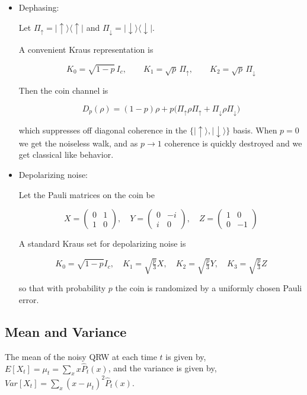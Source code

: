 \documentclass[11pt]{article}
\begin{document}
\begin{itemize}
\item Dephasing:

Let $\Pi_\uparrow = |\uparrow\rangle\langle\uparrow|$ and $\Pi_\downarrow = |\downarrow\rangle\langle\downarrow|$.

A convenient Kraus representation is

\[
K_0 = \sqrt{1-p}\,I_c, \qquad
K_1 = \sqrt{p}\,\Pi_\uparrow, \qquad
K_2 = \sqrt{p}\,\Pi_\downarrow
\]

Then the coin channel is

\begin{equation}\label{eq:5}
D_p(\rho) = (1-p)\rho + p\big(\Pi_\uparrow \rho \Pi_\uparrow + \Pi_\downarrow \rho \Pi_\downarrow\big)
\end{equation}

which suppresses off diagonal coherence in the $\{|\uparrow\rangle,|\downarrow\rangle\}$ basis. When $p=0$ we get the noiseless walk, and as $p\to 1$ coherence is quickly destroyed and we get classical like behavior.

\item Depolarizing noise:

Let the Pauli matrices on the coin be

\[
X=\begin{pmatrix}0&1\\1&0\end{pmatrix},\quad Y=\begin{pmatrix}0&-i\\ i&0\end{pmatrix},\quad Z=\begin{pmatrix}1&0\\0&-1\end{pmatrix}
\]

A standard Kraus set for depolarizing noise is

\[
K_0=\sqrt{1-p}I_c,\quad K_1=\sqrt{\tfrac{p}{3}}X,\quad K_2=\sqrt{\tfrac{p}{3}}Y,\quad K_3=\sqrt{\tfrac{p}{3}}Z
\]

so that with probability $p$ the coin is randomized by a uniformly chosen Pauli error.
\end{itemize}

\subsection*{Mean and Variance}

The mean of the noisy QRW at each time $t$ is given by, $E[X_t]=\mu_t=\sum_xx\hat P_t(x)$, and the variance is given by, $Var[X_t]=\sum_x(x-\mu_t)^2\hat P_t(x)$.
\end{document}

